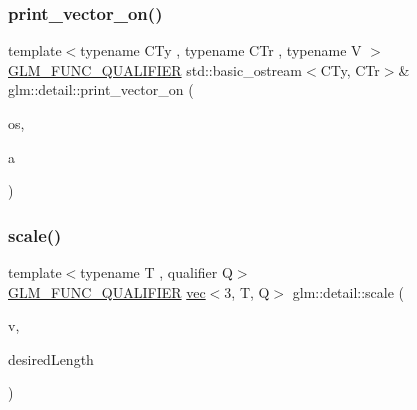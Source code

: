 \mbox{\label{namespaceglm_1_1detail_a9d760c8d2e4e01ac441fcbba7d387055}} 
\subsubsection{\texorpdfstring{print\+\_\+vector\+\_\+on()}{print\_vector\_on()}}
{\footnotesize\ttfamily template$<$typename C\+Ty , typename C\+Tr , typename V $>$ \\
\hyperlink{setup_8hpp_a33fdea6f91c5f834105f7415e2a64407}{G\+L\+M\+\_\+\+F\+U\+N\+C\+\_\+\+Q\+U\+A\+L\+I\+F\+I\+ER} std\+::basic\+\_\+ostream$<$C\+Ty, C\+Tr$>$\& glm\+::detail\+::print\+\_\+vector\+\_\+on (\begin{DoxyParamCaption}\item[{std\+::basic\+\_\+ostream$<$ C\+Ty, C\+Tr $>$ \&}]{os,  }\item[{V const \&}]{a }\end{DoxyParamCaption})}

\mbox{\label{namespaceglm_1_1detail_ab5e74c51452215027ae64d0ef1731f9c}} 
\subsubsection{\texorpdfstring{scale()}{scale()}}
{\footnotesize\ttfamily template$<$typename T , qualifier Q$>$ \\
\hyperlink{setup_8hpp_a33fdea6f91c5f834105f7415e2a64407}{G\+L\+M\+\_\+\+F\+U\+N\+C\+\_\+\+Q\+U\+A\+L\+I\+F\+I\+ER} \hyperlink{structglm_1_1vec}{vec}$<$3, T, Q$>$ glm\+::detail\+::scale (\begin{DoxyParamCaption}\item[{\hyperlink{structglm_1_1vec}{vec}$<$ 3, T, Q $>$ const \&}]{v,  }\item[{T}]{desired\+Length }\end{DoxyParamCaption})}

\mbox{\label{namespaceglm_1_1detail_a2cb8ceabe04661b078d956cf0a5e96c7}} 
